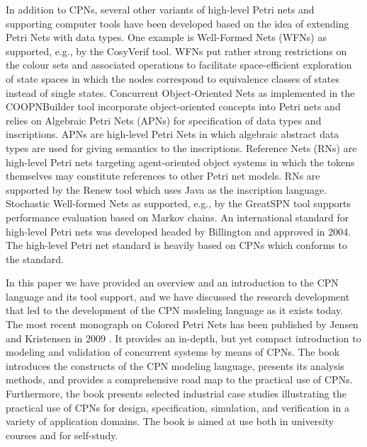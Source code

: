 In addition to CPNs, several other variants of high-level Petri nets
and supporting computer tools have been developed based on the idea of
extending Petri Nets with data types. One example is Well-Formed Nets
(WFNs) \cite{wfns} as supported, e.g., by the CosyVerif tool. WFNs put
rather strong restrictions on the colour sets and associated
operations to facilitate space-efficient exploration of state spaces
in which the nodes correspond to equivalence classes of states instead
of single states. Concurrent Object-Oriented Nets \cite{coopn} as
implemented in the COOPNBuilder tool incorporate object-oriented
concepts into Petri nets and relies on Algebraic Petri Nets (APNs)
\cite{apn} for specification of data types and inscriptions. APNs are
high-level Petri Nets in which algebraic abstract data types are used
for giving semantics to the inscriptions. Reference Nets (RNs)
\cite{rns} are high-level Petri nets targeting agent-oriented object
systems in which the tokens themselves may constitute references to
other Petri net models. RNs are supported by the Renew tool which uses
Java as the inscription language. Stochastic Well-formed Nets
\cite{swns} as supported, e.g., by the GreatSPN tool supports
performance evaluation based on Markov chains. An international
standard for high-level Petri nets was developed headed by Billington
\cite{hcpnstandard} and approved in 2004. The high-level Petri net
standard is heavily based on CPNs which conforms to the standard.



In this paper we have provided an overview and an introduction to the
CPN language and its tool support, and we have discussed the research
development that led to the development of the CPN modeling language
as it exists today. The most recent monograph on Colored Petri Nets
has been published by Jensen and Kristensen in 2009
\cite{newcpnbook}. It provides an in-depth, but yet compact
introduction to modeling and validation of concurrent systems by means
of CPNs. The book introduces the constructs of the CPN modeling
language, presents its analysis methods, and provides a comprehensive
road map to the practical use of CPNs. Furthermore, the book presents
selected industrial case studies illustrating the practical use of
CPNs for design, specification, simulation, and verification in a
variety of application domains. The book is aimed at use both in
university courses \cite{teaching} and for self-study.

